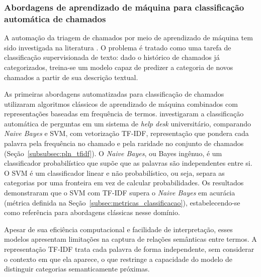 \documentclass[
    12pt,                %
    openright,           %
    oneside,             %
    a4paper,             %
    english,             %
    brazil               %
]{abntex2}
\begin{document}
\subsubsection{Abordagens de aprendizado de máquina para classificação automática de chamados}
\label{subsec:helpdesk_ml}

A automação da triagem de chamados por meio de aprendizado de máquina tem sido investigada na literatura \cite{zemp2021,wahba2023,yokota2025,razma2026}. O problema é tratado como uma tarefa de classificação supervisionada de texto: dado o histórico de chamados já categorizados, treina-se um modelo capaz de predizer a categoria de novos chamados a partir de sua descrição textual.

\label{subsubsec:helpdesk_classicos}

As primeiras abordagens automatizadas para classificação de chamados utilizaram algoritmos clássicos de aprendizado de máquina combinados com representações baseadas em frequência de termos.  investigaram a classificação automática de perguntas em um sistema de \textit{help desk} universitário, comparando \textit{Naive Bayes} e SVM, com vetorização TF-IDF, representação que pondera cada palavra pela frequência no chamado e pela raridade no conjunto de chamados (Seção~\ref{subsubsec:pln_tfidf}). O \textit{Naive Bayes}, ou Bayes ingênuo, é um classificador probabilístico que supõe que as palavras são independentes entre si. O SVM é um classificador linear e não probabilístico, ou seja, separa as categorias por uma fronteira em vez de calcular probabilidades. Os resultados demonstraram que o SVM com TF-IDF supera o \textit{Naive Bayes} em acurácia (métrica definida na Seção~\ref{subsec:metricas_classificacao}), estabelecendo-se como referência para abordagens clássicas nesse domínio.

Apesar de sua eficiência computacional e facilidade de interpretação, esses modelos apresentam limitações na captura de relações semânticas entre termos. A representação TF-IDF trata cada palavra de forma independente, sem considerar o contexto em que ela aparece, o que restringe a capacidade do modelo de distinguir categorias semanticamente próximas.

\label{subsubsec:helpdesk_cnn}
\end{document}
